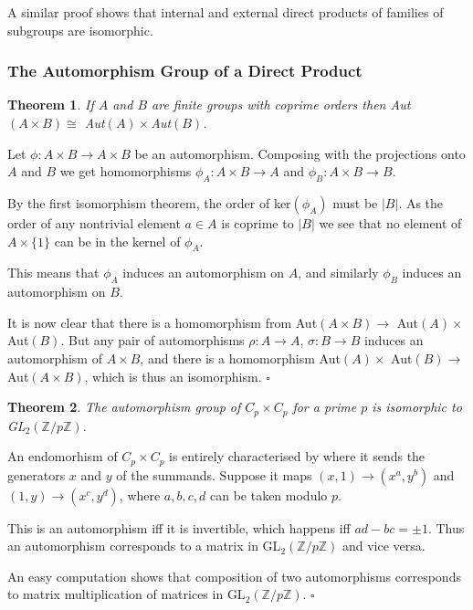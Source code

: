 \documentclass[10pt]{article}
\newtheorem{theorem}{Theorem}[section]
\newenvironment{proof}[1][Proof]{\begin{trivlist}
\item[\hskip \labelsep {\itshape #1}]}{\end{trivlist}}
\begin{document}
A similar proof shows that internal and external direct products of families of subgroups are isomorphic.

\subsubsection{The Automorphism Group of a Direct Product}

\begin{theorem}
If $A$ and $B$ are finite groups with coprime orders then Aut$(A\times B) \cong$ Aut$(A)\times$Aut$(B)$.
\end{theorem}

\begin{proof}
Let $\phi : A\times B \to A\times B$ be an automorphism. Composing with the projections onto $A$ and $B$ we get homomorphisms $\phi_A : A\times B \to A$ and $\phi_B : A\times B \to B$.

By the first isomorphism theorem, the order of ker$(\phi_A)$ must be $|B|$. As the order of any nontrivial element $a \in A$ is coprime to $|B|$ we see that no element of $A\times \{1\}$ can be in the kernel of $\phi_A$.

This means that $\phi_A$ induces an automorphism on $A$, and similarly $\phi_B$ induces an automorphism on $B$.

It is now clear that there is a homomorphism from Aut$(A\times B) \to$ Aut$(A)\times$ Aut$(B)$. But any pair of automorphisms $\rho : A \to A$, $\sigma : B \to B$ induces an automorphism of $A\times B$, and there is a homomorphism Aut$(A)\times$ Aut$(B) \to$ Aut$(A\times B)$, which is thus an isomorphism. $\square$
\end{proof}

\begin{theorem}
The automorphism group of $C_p\times C_p$ for a prime $p$ is isomorphic to GL$_2(\mathbb{Z}/p\mathbb{Z})$.
\end{theorem}

\begin{proof}
An endomorhism of $C_p\times C_p$ is entirely characterised by where it sends the generators $x$ and $y$ of the summands. Suppose it maps $(x, 1) \to (x^a, y^b)$ and $(1, y) \to (x^c, y^d)$, where $a, b, c, d$ can be taken modulo $p$.

This is an automorphism iff it is invertible, which happens iff $ad - bc = \pm 1$. Thus an automorphism corresponds to a matrix in GL$_2(\mathbb{Z}/p\mathbb{Z})$ and vice versa.

An easy computation shows that composition of two automorphisms corresponds to matrix multiplication of matrices in GL$_2(\mathbb{Z}/p\mathbb{Z})$. $\square$
\end{proof}
\end{document}
